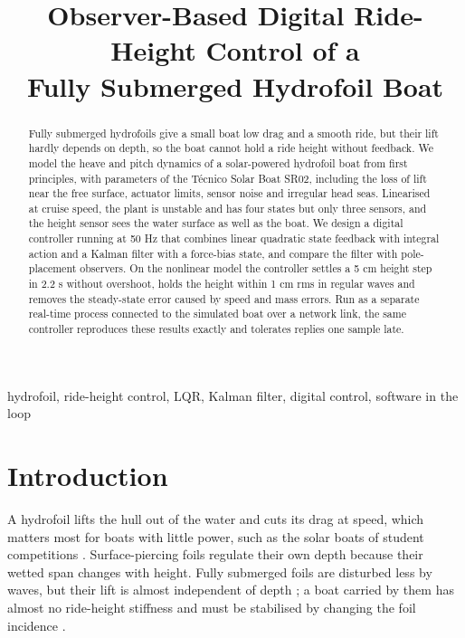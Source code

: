 \documentclass[conference]{IEEEtran}
\begin{document}
\title{Observer-Based Digital Ride-Height Control of a\\ Fully Submerged Hydrofoil Boat}

\author{
}

\maketitle

\begin{abstract}
Fully submerged hydrofoils give a small boat low drag and a smooth ride, but
their lift hardly depends on depth, so the boat cannot hold a ride height
without feedback. We model the heave and pitch dynamics of a solar-powered
hydrofoil boat from first principles, with parameters of the T\'ecnico Solar
Boat SR02, including the loss of lift near the free surface, actuator limits,
sensor noise and irregular head seas. Linearised at cruise speed, the plant is
unstable and has four states but only three sensors, and the height sensor sees
the water surface as well as the boat. We design a digital controller running
at 50 Hz that combines linear quadratic state feedback with integral action and
a Kalman filter with a force-bias state, and compare the filter with
pole-placement observers. On the nonlinear model the controller settles a 5 cm
height step in 2.2 s without overshoot, holds the height within 1 cm rms in
regular waves and removes the steady-state error caused by speed and mass
errors. Run as a separate real-time process connected to the simulated boat
over a network link, the same controller reproduces these results exactly and
tolerates replies one sample late.
\end{abstract}

\begin{IEEEkeywords}
hydrofoil, ride-height control, LQR, Kalman filter, digital control,
software in the loop
\end{IEEEkeywords}

\section{Introduction}

A hydrofoil lifts the hull out of the water and cuts its drag at speed, which
matters most for boats with little power, such as the solar boats of student
competitions \cite{belime,marrewijk}. Surface-piercing foils
regulate their own depth because their wetted span changes with height. Fully
submerged foils are disturbed less by waves, but their lift is almost
independent of depth \cite{faltinsen}; a boat carried by them has almost no ride-height
stiffness and must be stabilised by changing the foil incidence
\cite{faltinsen,belime}.
\end{document}
